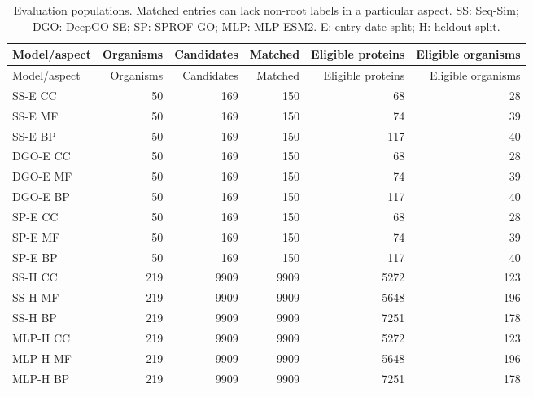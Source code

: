 \begingroup\scriptsize
\setlength{\tabcolsep}{4pt}
\begin{longtable}{lrrrrr}
\caption{Evaluation populations. Matched entries can lack non-root labels in a particular aspect. SS: Seq-Sim; DGO: DeepGO-SE; SP: SPROF-GO; MLP: MLP-ESM2. E: entry-date split; H: heldout split.}\label{tab:supp-scope}\\
\toprule
Model/aspect & Organisms & Candidates & Matched & Eligible proteins & Eligible organisms \\
\midrule
\endfirsthead
\toprule
Model/aspect & Organisms & Candidates & Matched & Eligible proteins & Eligible organisms \\
\midrule
\endhead
SS-E CC & 50 & 169 & 150 & 68 & 28 \\
SS-E MF & 50 & 169 & 150 & 74 & 39 \\
SS-E BP & 50 & 169 & 150 & 117 & 40 \\
DGO-E CC & 50 & 169 & 150 & 68 & 28 \\
DGO-E MF & 50 & 169 & 150 & 74 & 39 \\
DGO-E BP & 50 & 169 & 150 & 117 & 40 \\
SP-E CC & 50 & 169 & 150 & 68 & 28 \\
SP-E MF & 50 & 169 & 150 & 74 & 39 \\
SP-E BP & 50 & 169 & 150 & 117 & 40 \\
SS-H CC & 219 & 9909 & 9909 & 5272 & 123 \\
SS-H MF & 219 & 9909 & 9909 & 5648 & 196 \\
SS-H BP & 219 & 9909 & 9909 & 7251 & 178 \\
MLP-H CC & 219 & 9909 & 9909 & 5272 & 123 \\
MLP-H MF & 219 & 9909 & 9909 & 5648 & 196 \\
MLP-H BP & 219 & 9909 & 9909 & 7251 & 178 \\
\bottomrule
\end{longtable}
\endgroup
